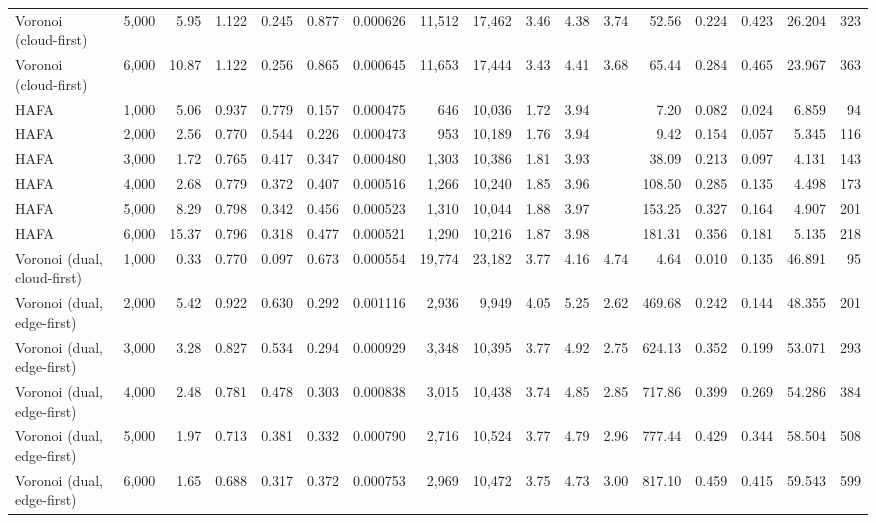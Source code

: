 \documentclass[10pt,conference]{IEEEtran}
\begin{document}
\begin{table}
{\begin{tabular}{lrrrrrrrrrrrrrrrr}
Voronoi (cloud-first) & 5,000 & 5.95 & 1.122 & 0.245 & 0.877 & 0.000626 & 11,512 & 17,462 & 3.46 & 4.38 & 3.74 & 52.56 & 0.224 & 0.423 & 26.204 & 323 \\
Voronoi (cloud-first) & 6,000 & 10.87 & 1.122 & 0.256 & 0.865 & 0.000645 & 11,653 & 17,444 & 3.43 & 4.41 & 3.68 & 65.44 & 0.284 & 0.465 & 23.967 & 363 \\
HAFA & 1,000 & 5.06 & 0.937 & 0.779 & 0.157 & 0.000475 & 646 & 10,036 & 1.72 & 3.94 &  & 7.20 & 0.082 & 0.024 & 6.859 & 94 \\
HAFA & 2,000 & 2.56 & 0.770 & 0.544 & 0.226 & 0.000473 & 953 & 10,189 & 1.76 & 3.94 &  & 9.42 & 0.154 & 0.057 & 5.345 & 116 \\
HAFA & 3,000 & 1.72 & 0.765 & 0.417 & 0.347 & 0.000480 & 1,303 & 10,386 & 1.81 & 3.93 &  & 38.09 & 0.213 & 0.097 & 4.131 & 143 \\
HAFA & 4,000 & 2.68 & 0.779 & 0.372 & 0.407 & 0.000516 & 1,266 & 10,240 & 1.85 & 3.96 &  & 108.50 & 0.285 & 0.135 & 4.498 & 173 \\
HAFA & 5,000 & 8.29 & 0.798 & 0.342 & 0.456 & 0.000523 & 1,310 & 10,044 & 1.88 & 3.97 &  & 153.25 & 0.327 & 0.164 & 4.907 & 201 \\
HAFA & 6,000 & 15.37 & 0.796 & 0.318 & 0.477 & 0.000521 & 1,290 & 10,216 & 1.87 & 3.98 &  & 181.31 & 0.356 & 0.181 & 5.135 & 218 \\
Voronoi (dual, cloud-first) & 1,000 & 0.33 & 0.770 & 0.097 & 0.673 & 0.000554 & 19,774 & 23,182 & 3.77 & 4.16 & 4.74 & 4.64 & 0.010 & 0.135 & 46.891 & 95 \\
Voronoi (dual, edge-first) & 2,000 & 5.42 & 0.922 & 0.630 & 0.292 & 0.001116 & 2,936 & 9,949 & 4.05 & 5.25 & 2.62 & 469.68 & 0.242 & 0.144 & 48.355 & 201 \\
Voronoi (dual, edge-first) & 3,000 & 3.28 & 0.827 & 0.534 & 0.294 & 0.000929 & 3,348 & 10,395 & 3.77 & 4.92 & 2.75 & 624.13 & 0.352 & 0.199 & 53.071 & 293 \\
Voronoi (dual, edge-first) & 4,000 & 2.48 & 0.781 & 0.478 & 0.303 & 0.000838 & 3,015 & 10,438 & 3.74 & 4.85 & 2.85 & 717.86 & 0.399 & 0.269 & 54.286 & 384 \\
Voronoi (dual, edge-first) & 5,000 & 1.97 & 0.713 & 0.381 & 0.332 & 0.000790 & 2,716 & 10,524 & 3.77 & 4.79 & 2.96 & 777.44 & 0.429 & 0.344 & 58.504 & 508 \\
Voronoi (dual, edge-first) & 6,000 & 1.65 & 0.688 & 0.317 & 0.372 & 0.000753 & 2,969 & 10,472 & 3.75 & 4.73 & 3.00 & 817.10 & 0.459 & 0.415 & 59.543 & 599 \\
\bottomrule
\end{tabular}
}
\end{table}
\end{document}
